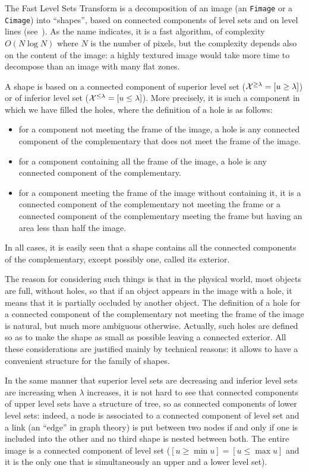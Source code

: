 The Fast Level Sets Transform is a decomposition of an image
(an \texttt{Fimage} or a \texttt{Cimage}) into ``shapes'', based on connected
components of level sets and on level lines 
(see~\cite{monasse.guichard:fast}\cite{monasse.guichard:scale-space}\cite{ballester.caselles.ea:tree}). 
As the name indicates, it is a fast algorithm, of complexity $O(N\log N)$
where $N$ is the number of pixels, but the complexity depends
also on the content of the image: a highly textured image would
take more time to decompose than an image with many flat zones.

A shape is based on a connected component of superior level set
(${\cal X}^{\geq \lambda} = [u\geq \lambda]$) or of inferior
level set (${\cal X}^{\leq \lambda} = [u \leq \lambda]$). More
precisely, it is such a component in which we have filled the
holes, where the definition of a hole is as follows:
\begin{itemize}
\item for a component not meeting the frame of the image, a hole
is any connected component of the complementary that does not meet
the frame of the image.
\item for a component containing all the frame of the image, a
hole is any connected component of the complementary.
\item for a component meeting the frame of the image without
containing it, it is a connected component of the
complementary not meeting the frame or a connected component of
the complementary meeting the frame but having an area less than
half the image.
\end{itemize}
In all cases, it is easily seen that a shape contains all the
connected components of the complementary, except possibly one,
called its exterior.

The reason for considering such things is that in the physical world,
most objects are full, without holes, so that if an object appears in
the image with a hole, it means that it is partially occluded by another
object. The definition of a hole for a connected component of the
complementary not meeting the frame of the image is natural, but much
more ambiguous otherwise. Actually, such holes are defined so as to make
the shape as small as possible leaving a connected exterior. All these
considerations are justified mainly by technical reasons: it allows to have
a convenient structure for the family of shapes.

In the same manner that superior level sets are decreasing and inferior level
sets are increasing when $\lambda$ increases, it is not hard to see that
connected components of upper level sets have a structure of tree, so as
connected components of lower level sets: indeed, a node is associated to
a connected component of level set and a link (an ``edge'' in graph theory)
is put between two nodes if and only if one is included into the other and
no third shape is nested between both. The entire image is a connected
component of level set ($[u\geq \min u] = [u \leq \max u]$ and it is the only
one that is simultaneously an upper and a lower level set).

